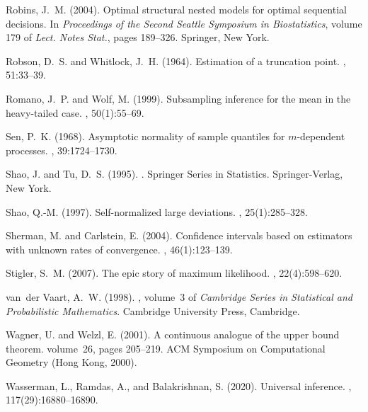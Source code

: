 \documentclass{article}
\numberwithin{myalgctr}{section}
\begin{document}
\begin{thebibliography}{}
Robins, J.~M. (2004).
\newblock Optimal structural nested models for optimal sequential decisions.
\newblock In {\em Proceedings of the {S}econd {S}eattle {S}ymposium in
  {B}iostatistics}, volume 179 of {\em Lect. Notes Stat.}, pages 189--326.
  Springer, New York.

Robson, D.~S. and Whitlock, J.~H. (1964).
\newblock Estimation of a truncation point.
, 51:33--39.

Romano, J.~P. and Wolf, M. (1999).
\newblock Subsampling inference for the mean in the heavy-tailed case.
, 50(1):55--69.

Sen, P.~K. (1968).
\newblock Asymptotic normality of sample quantiles for {$m$}-dependent
  processes.
, 39:1724--1730.

Shao, J. and Tu, D.~S. (1995).
.
\newblock Springer Series in Statistics. Springer-Verlag, New York.

Shao, Q.-M. (1997).
\newblock Self-normalized large deviations.
, 25(1):285--328.

Sherman, M. and Carlstein, E. (2004).
\newblock Confidence intervals based on estimators with unknown rates of
  convergence.
, 46(1):123--139.

Stigler, S.~M. (2007).
\newblock The epic story of maximum likelihood.
, 22(4):598--620.

van~der Vaart, A.~W. (1998).
, volume~3 of {\em Cambridge Series in
  Statistical and Probabilistic Mathematics}.
\newblock Cambridge University Press, Cambridge.

Wagner, U. and Welzl, E. (2001).
\newblock A continuous analogue of the upper bound theorem.
\newblock volume~26, pages 205--219.
\newblock ACM Symposium on Computational Geometry (Hong Kong, 2000).

Wasserman, L., Ramdas, A., and Balakrishnan, S. (2020).
\newblock Universal inference.
, 117(29):16880--16890.


\end{thebibliography}
\end{document}
